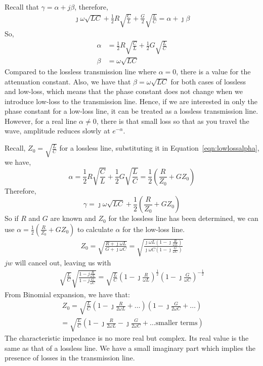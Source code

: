 Recall that $\gamma = \alpha + j\beta$, therefore,
\begin{align*}
\jmath\omega\sqrt{LC} + \frac{1}{2}R\sqrt{\frac{C}{L}} + \frac{G}{2}\sqrt{\frac{L}{C}} = \alpha + \jmath\beta
\end{align*}
So,
\begin{align}
\alpha &= \frac{1}{2}R\sqrt{\frac{C}{L}} + \frac{1}{2}G\sqrt{\frac{L}{C}}\label{eqn:lowlossalpha}\\
\beta &= \omega\sqrt{LC}
\end{align}
Compared to the lossless transmission line where $\alpha = 0$, there is a value for the attenuation constant. Also, we have that $\beta = \omega\sqrt{LC}$ for both cases of lossless and low-loss, which means that the phase constant does not change when we introduce low-loss to the transmission line. Hence, if we are interested in only the phase constant for a low-loss line, it can be treated as a lossless transmission line. However, for a real line $\alpha \neq 0$, there is that small loss so that as you travel the wave, amplitude reduces slowly at $e^{-\alpha}$.

Recall, $Z_0 = \sqrt{\frac{L}{C}}$ for a lossless line, substituting it in Equation~\ref{eqn:lowlossalpha}, we have,
\[\alpha = \frac{1}{2}R\sqrt{\frac{C}{L}} + \frac{1}{2}G\sqrt{\frac{L}{C}} = \frac{1}{2}(\frac{R}{Z_0} + GZ_0)\]
Therefore,
\[\gamma = \jmath\omega\sqrt{LC} + \frac{1}{2}(\frac{R}{Z_0} + GZ_0)\]
So if $R$ and $G$ are known and $Z_0$ for the lossless line has been determined, we can use $\alpha = \frac{1}{2}(\frac{R}{Z_0} + GZ_0)$ to calculate $\alpha$ for the low-loss line.
\begin{align*}
Z_0 = \sqrt{\frac{R + \jmath\omega L}{G + \jmath\omega C}} = \sqrt{\frac{\jmath\omega L(1 - \jmath\frac{R}{\omega L})}{\jmath\omega C(1 - \jmath\frac{G}{\omega C})}}
\end{align*}
$jw$ will cancel out, leaving us with
\begin{align*}
\sqrt{\frac{L}{C}}\sqrt{\frac{1 - j\frac{R}{\omega L}}{1 - j\frac{G}{\omega C}}} =\sqrt{\frac{L}{C}}\left(1 - \jmath\frac{R}{\omega L}\right)^{\frac{1}{2}}\left(1 - \jmath\frac{G}{\omega C}\right)^{-\frac{1}{2}} 
\end{align*}
From Binomial expansion, we have that:
\begin{align*}
Z_0 = \sqrt{\frac{L}{C}}\left(1 - \jmath\frac{R}{2\omega L} + \ldots\right)\left(1 - \jmath\frac{G}{2\omega C} + \ldots\right)
\end{align*}
\begin{align*}
= \sqrt{\frac{L}{C}}\left(1 - \jmath\frac{R}{2\omega L} - \jmath\frac{G}{2\omega C} + \text{\ldots smaller terms}\right)
\end{align*}
The characteristic impedance is no more real but complex. Its real value is the same as that of a lossless line. We have a small imaginary part which implies the presence of losses in the transmission line.

